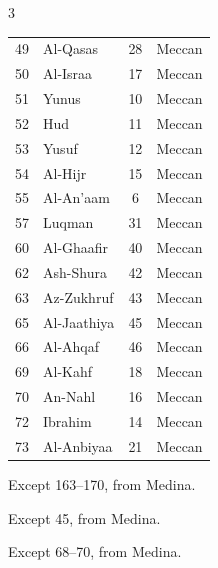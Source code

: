 \documentclass{article}
\renewcommand{\footnotesize}{\scriptsize}
\begin{document}
\begin{center}
\begin{multicols}{3}
\begin{threeparttable}
\begin{tabular}{@{}r l c l@{}}
                49            & Al-Qasas\tnote{15}     & 28           & Meccan        \\
                50            & Al-Israa\tnote{16}     & 17           & Meccan        \\
                51            & Yunus\tnote{17}        & 10           & Meccan        \\
                52            & Hud\tnote{18}          & 11           & Meccan        \\
                53            & Yusuf\tnote{19}        & 12           & Meccan        \\
                54            & Al-Hijr\tnote{20}      & 15           & Meccan        \\
                55            & Al-An'aam\tnote{21}    & 6            & Meccan        \\
                57            & Luqman\tnote{22}       & 31           & Meccan        \\
                60            & Al-Ghaafir\tnote{23}   & 40           & Meccan        \\
                62            & Ash-Shura\tnote{24}    & 42           & Meccan        \\
                63            & Az-Zukhruf\tnote{25}   & 43           & Meccan        \\
                65            & Al-Jaathiya\tnote{26}  & 45           & Meccan        \\
                66            & Al-Ahqaf\tnote{27}     & 46           & Meccan        \\
                69            & Al-Kahf\tnote{28}      & 18           & Meccan        \\
                70            & An-Nahl\tnote{29}      & 16           & Meccan        \\
                72            & Ibrahim\tnote{30}      & 14           & Meccan        \\
                73            & Al-Anbiyaa             & 21           & Meccan        \\
            \end{tabular}
            \begin{tablenotes}
                \footnotesize
                \item[8] Except 163--170, from Medina.
                \item[9] Except 45, from Medina.
                \item[10] Except 68--70, from Medina.

\end{tablenotes}
\end{threeparttable}
\end{multicols}
\end{center}
\end{document}
